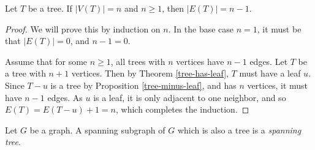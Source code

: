 \documentclass[12pt]{article}
\begin{document}
\begin{prop}
    Let $T$ be a tree. If $|V(T)| = n$ and $n \geq 1$, then $|E(T)| = n-1$.
\end{prop}

\begin{proof}
    We will prove this by induction on $n$. In the base case $n=1$, it must be that $|E(T)| = 0$, and $n-1 = 0$.

    Assume that for some $n \geq 1$, all trees with $n$ vertices have $n-1$ edges. Let $T$ be a tree with $n+1$ vertices. Then by Theorem \ref{tree-has-leaf}, $T$ must have a leaf $u$. Since $T - u$ is a tree by Proposition \ref{tree-minus-leaf}, and has $n$ vertices, it must have $n-1$ edges. As $u$ is a leaf, it is only adjacent to one neighbor, and so $E(T) = E(T - u) + 1 = n$, which completes the induction.
\end{proof}

\begin{defn}
    Let $G$ be a graph. A spanning subgraph of $G$ which is also a tree is a \emph{spanning tree}.
\end{defn}
\end{document}
